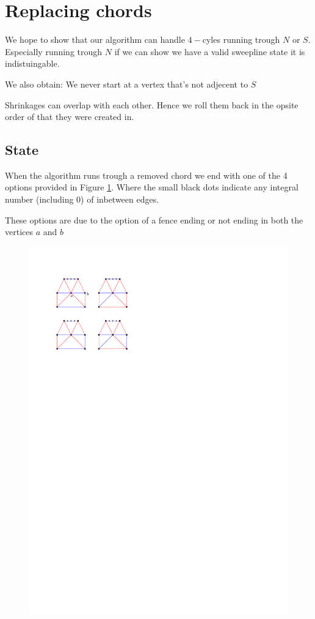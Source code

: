 
\section{Replacing chords}
We hope to show that our algorithm can handle $4-$cyles running trough $N$ or $S$. Especially running trough $N$ if we can show we have a valid sweepline state it is indistuingable.

We also obtain: We never start at a vertex that's not adjecent to $S$


Shrinkages can overlap with each other. Hence we roll them back in the opsite order of that they were created in.

\subsection{State}
When the algorithm runs trough a removed chord we end with one of the 4 options provided in Figure
\ref{fig:replace:options}. Where the small black dots indicate any integral number (including 0) of inbetween edges.

These options are due to the option of a fence ending or not ending in both the vertices $a$ and $b$

\begin{figure}[h]
  \centering
  \includegraphics[scale=1]{chordReplace/img/options}
  \caption{}
  \label{fig:replace:options}
\end{figure}


